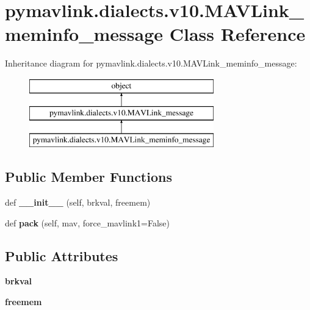 \hypertarget{classpymavlink_1_1dialects_1_1v10_1_1MAVLink__meminfo__message}{}\section{pymavlink.\+dialects.\+v10.\+M\+A\+V\+Link\+\_\+meminfo\+\_\+message Class Reference}
\label{classpymavlink_1_1dialects_1_1v10_1_1MAVLink__meminfo__message}
Inheritance diagram for pymavlink.\+dialects.\+v10.\+M\+A\+V\+Link\+\_\+meminfo\+\_\+message\+:\begin{figure}[H]
\begin{center}
\leavevmode
\includegraphics[height=3.000000cm]{classpymavlink_1_1dialects_1_1v10_1_1MAVLink__meminfo__message}
\end{center}
\end{figure}
\subsection*{Public Member Functions}
\begin{DoxyCompactItemize}
\item 
\mbox{\label{classpymavlink_1_1dialects_1_1v10_1_1MAVLink__meminfo__message_a996caadb16924941ec62b08b51f0fe9c}} 
def {\bfseries \+\_\+\+\_\+init\+\_\+\+\_\+} (self, brkval, freemem)
\item 
\mbox{\label{classpymavlink_1_1dialects_1_1v10_1_1MAVLink__meminfo__message_a751c634c07440d07e85a068e6eeab22f}} 
def {\bfseries pack} (self, mav, force\+\_\+mavlink1=False)
\end{DoxyCompactItemize}
\subsection*{Public Attributes}
\begin{DoxyCompactItemize}
\item 
\mbox{\label{classpymavlink_1_1dialects_1_1v10_1_1MAVLink__meminfo__message_a039d11d88ebe443b96f3fbc269048c4d}} 
{\bfseries brkval}
\item 
\mbox{\label{classpymavlink_1_1dialects_1_1v10_1_1MAVLink__meminfo__message_ad44223f5e56bf909abfa4e4e6408808b}} 
{\bfseries freemem}
\end{DoxyCompactItemize}
